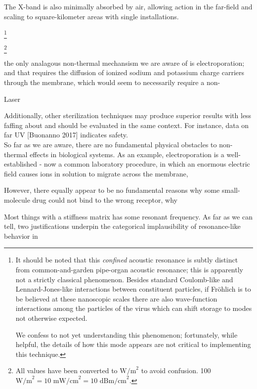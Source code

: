 \documentclass[paper.tex]{subfiles}
\begin{document}
The X-band is also minimally absorbed by air, allowing action in the far-field and scaling to square-kilometer areas with single installations.






\footnote{It should be noted that this {\it confined} acoustic resonance is subtly distinct from common-and-garden pipe-organ acoustic resonance; this is apparently not a strictly classical phenomenon. Besides standard Coulomb-like and Lennard-Jones-like interactions between constituent particles, if Fr\"{o}hlich is to be believed at these nanoscopic scales there are also wave-function interactions among the particles of the virus which can shift storage to modes not otherwise expected.
	
	We confess to not yet understanding this phenomenon; fortunately, while helpful, the details of how this mode appears are not critical to implementing this technique.}


\footnote{All values have been converted to $\text{W/m}^2$ to avoid confusion. 100 $\text{W/m}^2 = 10 \text{ mW/cm}^2 = 10 \text{ dBm/cm}^2$.}




the only analagous non-thermal mechansism we are aware of is electroporation; and that requires the diffusion of ionized sodium and potassium charge carriers through the membrane, which would seem to necessarily require a non-

Laser


Additionally, other sterilization techniques may produce superior results with less faffing about and should be evaluated in the same context. For instance, data on far UV [Buonanno 2017] indicates safety.\\


So far as we are aware, there are no fundamental physical obstacles to non-thermal effects in biological systems. As an example, electroporation is a well-established - now a common laboratory procedure, in which an enormous electric field causes ions in solution to migrate across the membrane, 

However, there equally appear to be no fundamental reasons why some small-molecule drug could not bind to the wrong receptor, why 



Most things with a stiffness matrix has some resonant frequency\citationneeded. As far as we can tell, two justifications underpin the categorical implausibility of resonance-like behavior in 
\end{document}
